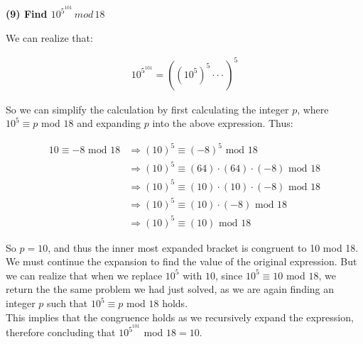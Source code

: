 \documentclass[20pt]{article}
\begin{document}
\noindent
\textbf{(9) Find $10^{5^{101}} \, mod \, 18$}\\
\begin{text}
    We can realize that:
    
    \begin{align}
        10^{5^{101}} = ((10^5)^5 \cdot\cdot\cdot)^5\tag{$10^5$, 101 times}
    \end{align}
    
    \noindent
    So we can simplify the calculation by first calculating the integer $p$, where $10^5 \equiv p$ mod $18$ and expanding $p$ into the above expression. Thus:
    
    \begin{align}
        10 \equiv -8 \text{ mod } 18 &\Longrightarrow (10)^5 \equiv (-8)^5 \text{ mod } 18\nonumber\\
        &\Longrightarrow (10)^5 \equiv (64) \cdot (64) \cdot (-8) \text{ mod } 18\nonumber\\
        &\Longrightarrow (10)^5 \equiv (10) \cdot (10) \cdot (-8) \text{ mod } 18\nonumber\tag{Since $64$ mod $18 = 10$}\\
        &\Longrightarrow (10)^5 \equiv (10) \cdot (-8) \text{ mod } 18\nonumber\tag{Since $100$ mod $18 = 10$}\\
        &\Longrightarrow (10)^5 \equiv (10) \text{ mod } 18\nonumber\tag{Since $-80$ mod $18 = 10$}
    \end{align}
    
    \noindent
    So $p = 10$, and thus the inner most expanded bracket is congruent to 10 mod 18. We must continue the expansion to find the value of the original expression. But we can realize that when we replace $10^5$ with $10$, since $10^5 \equiv 10$ mod $18$, we return the the same problem we had just solved, as we are again finding an integer $p$ such that $10^5 \equiv p$ mod $18$ holds.\\
    
    \noindent
    This implies that the congruence holds as we recursively expand the expression, therefore concluding that $10^{5^{101}}$ mod $18 = 10$.
\end{text}\\
\end{document}

